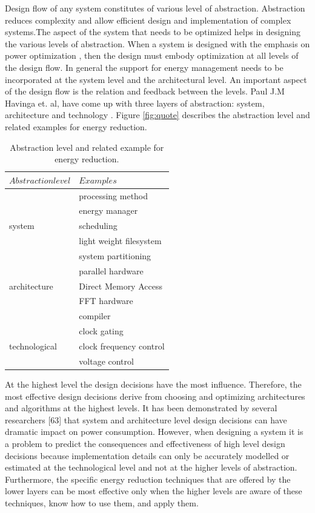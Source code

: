  Design flow of any system constitutes of various level of abstraction. Abstraction reduces complexity  and allow efficient design and implementation of complex systems.The aspect of the system that needs to be optimized helps in designing the various levels of abstraction. When a system is designed with the emphasis on power optimization , then the design must embody optimization at all levels of the design flow. In general the support for energy management needs to be incorporated at the system level and the architectural level. An important aspect of the design flow is the relation and feedback between the levels. Paul J.M Havinga et. al, 
 have come up with three layers of abstraction: system, architecture and technology \cite{}. Figure \ref{fig:quote} describes the abstraction level and related examples for energy reduction.
 \begin{table}
 	\centering
 	\begin{tabular}{|l|l|}
 		\hline
 		$Abstraction level$ & $Examples$  \\
 		\hline
 		  & processing method \\
 		  & energy manager \\
 		  system & scheduling \\
 		  & light weight filesystem \\
 		  & system partitioning \\
 		  & parallel hardware \\
 		  architecture & Direct Memory Access \\
 		  & FFT hardware \\
 		  & compiler \\
 		  & clock gating \\
 		  technological & clock frequency control \\
 		  & voltage control \\
 		\hline
 	\end{tabular}
 	\caption{Abstraction level and related example for energy reduction.}
 	\label{table:ecg}
 \end{table}


 At the highest level the design decisions have the most influence. 
 Therefore, the most effective design decisions derive from choosing and optimizing 
 architectures and algorithms at the highest levels. It has been demonstrated by several 
 researchers [63] that system and architecture level design decisions can have dramatic 
 impact on power consumption. However, when designing a system it is a problem to 
 predict the consequences and effectiveness of high level design decisions because implementation details can only be accurately modelled or estimated at the technological 
 level and not at the higher levels of abstraction. Furthermore, the specific energy 
 reduction techniques that are offered by the lower layers can be most effective only 
 when the higher levels are aware of these techniques, know how to use them, and apply 
 them.
 
